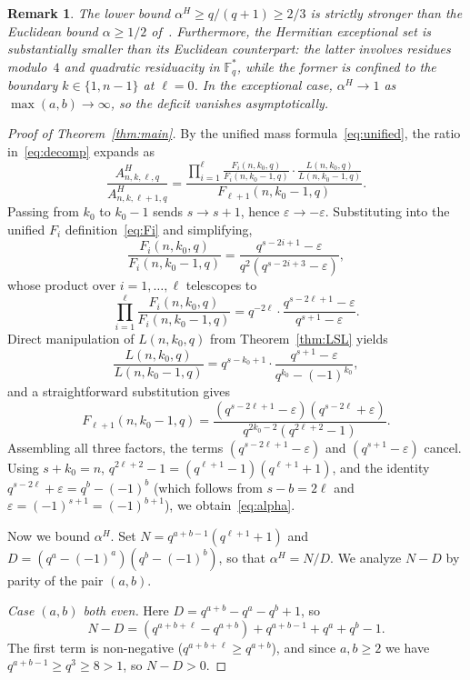 \documentclass[10pt,a4paper]{amsart}
\newtheorem{remark}[theorem]{Remark}
\newcommand{\F}{\mathbb{F}}
\begin{document}
\begin{remark}
The lower bound $\alpha^H \geq q/(q+1) \geq 2/3$ is strictly stronger
than the Euclidean bound $\alpha \geq 1/2$ of~\cite{BBOz2026}.
Furthermore, the Hermitian exceptional set is substantially smaller than its
Euclidean counterpart: the latter involves residues modulo~$4$ and quadratic
residuacity in $\F_q^*$, while the former is confined to the boundary
$k\in\{1,n-1\}$ at $\ell = 0$. In the exceptional case, $\alpha^H \to 1$
as $\max(a,b) \to \infty$, so the deficit vanishes asymptotically.
\end{remark}


\begin{proof}[Proof of Theorem~\ref{thm:main}]
By the unified mass formula~\eqref{eq:unified}, the ratio in~\eqref{eq:decomp}
expands as
\[
  \frac{A^H_{n,k,\ell,q}}{A^H_{n,k,\ell+1,q}}
  = \frac{\prod_{i=1}^{\ell}\frac{F_i(n,k_0,q)}{F_i(n,k_0-1,q)}\cdot
    \frac{L(n,k_0,q)}{L(n,k_0-1,q)}}{F_{\ell+1}(n,k_0-1,q)}.
\]
Passing from $k_0$ to $k_0-1$ sends $s\to s+1$, hence $\varepsilon\to -\varepsilon$.
Substituting into the unified $F_i$ definition~\eqref{eq:Fi} and simplifying,
\[
  \frac{F_i(n,k_0,q)}{F_i(n,k_0-1,q)} = \frac{q^{s-2i+1}-\varepsilon}{q^{2}(q^{s-2i+3}-\varepsilon)},
\]
whose product over $i = 1, \ldots, \ell$ telescopes to
\[
  \prod_{i=1}^{\ell}\frac{F_i(n,k_0,q)}{F_i(n,k_0-1,q)}
  = q^{-2\ell} \cdot \frac{q^{s-2\ell+1}-\varepsilon}{q^{s+1}-\varepsilon}.
\]
Direct manipulation of $L(n, k_0, q)$ from Theorem~\ref{thm:LSL} yields
\[
  \frac{L(n,k_0,q)}{L(n,k_0-1,q)} = q^{s-k_0+1}\cdot\frac{q^{s+1}-\varepsilon}{q^{k_0}-(-1)^{k_0}},
\]
and a straightforward substitution gives
\[
  F_{\ell+1}(n,k_0-1,q) = \frac{(q^{s-2\ell+1}-\varepsilon)(q^{s-2\ell}+\varepsilon)}{q^{2k_0-2}(q^{2\ell+2}-1)}.
\]
Assembling all three factors, the terms $(q^{s-2\ell+1}-\varepsilon)$ and
$(q^{s+1}-\varepsilon)$ cancel. Using $s+k_0 = n$,
$q^{2\ell+2}-1 = (q^{\ell+1}-1)(q^{\ell+1}+1)$, and the identity
$q^{s-2\ell}+\varepsilon = q^{b}-(-1)^{b}$
(which follows from $s-b = 2\ell$ and $\varepsilon = (-1)^{s+1} = (-1)^{b+1}$),
we obtain~\eqref{eq:alpha}.

Now we bound $\alpha^H$.
Set $N = q^{a+b-1}(q^{\ell+1}+1)$ and $D = (q^{a}-(-1)^{a})(q^{b}-(-1)^{b})$,
so that $\alpha^H = N/D$. We analyze $N - D$ by parity of the pair $(a,b)$.

\emph{Case $(a, b)$ both even.}
Here $D = q^{a+b}-q^{a}-q^{b}+1$, so
\[
  N - D = (q^{a+b+\ell}-q^{a+b}) + q^{a+b-1} + q^{a} + q^{b} - 1.
\]
The first term is non-negative ($q^{a+b+\ell} \geq q^{a+b}$), and since
$a, b \geq 2$ we have $q^{a+b-1} \geq q^3 \geq 8 > 1$, so $N - D > 0$.


\end{proof}
\end{document}
